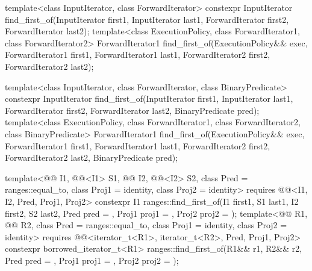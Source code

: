 %
\begin{itemdecl}
template<class InputIterator, class ForwardIterator>
  constexpr InputIterator
    find_first_of(InputIterator first1, InputIterator last1,
                  ForwardIterator first2, ForwardIterator last2);
template<class ExecutionPolicy, class ForwardIterator1, class ForwardIterator2>
  ForwardIterator1
    find_first_of(ExecutionPolicy&& exec,
                  ForwardIterator1 first1, ForwardIterator1 last1,
                  ForwardIterator2 first2, ForwardIterator2 last2);

template<class InputIterator, class ForwardIterator,
         class BinaryPredicate>
  constexpr InputIterator
    find_first_of(InputIterator first1, InputIterator last1,
                  ForwardIterator first2, ForwardIterator last2,
                  BinaryPredicate pred);
template<class ExecutionPolicy, class ForwardIterator1, class ForwardIterator2,
         class BinaryPredicate>
  ForwardIterator1
    find_first_of(ExecutionPolicy&& exec,
                  ForwardIterator1 first1, ForwardIterator1 last1,
                  ForwardIterator2 first2, ForwardIterator2 last2,
                  BinaryPredicate pred);

template<@@ I1, @@<I1> S1, @@ I2, @@<I2> S2,
         class Pred = ranges::equal_to, class Proj1 = identity, class Proj2 = identity>
  requires @@<I1, I2, Pred, Proj1, Proj2>
  constexpr I1 ranges::find_first_of(I1 first1, S1 last1, I2 first2, S2 last2,
                                     Pred pred = {},
                                     Proj1 proj1 = {}, Proj2 proj2 = {});
template<@@ R1, @@ R2,
         class Pred = ranges::equal_to, class Proj1 = identity, class Proj2 = identity>
  requires @@<iterator_t<R1>, iterator_t<R2>, Pred, Proj1, Proj2>
  constexpr borrowed_iterator_t<R1>
    ranges::find_first_of(R1&& r1, R2&& r2,
                          Pred pred = {},
                          Proj1 proj1 = {}, Proj2 proj2 = {});
\end{itemdecl}

